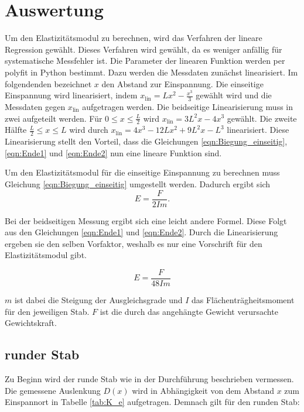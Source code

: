 


\section{Auswertung}
Um den Elastizitätsmodul zu berechnen, wird das Verfahren der lineare Regression gewählt. Dieses Verfahren wird gewählt, 
da es weniger anfällig für systematische Messfehler ist. Die Parameter der linearen Funktion werden per polyfit in Python 
bestimmt. Dazu werden die Messdaten 
zunächst linearisiert. Im folgendenden bezeichnet $x$ den Abstand zur Einspannung.
Die einseitige Einspannung wird linearisiert, indem $x_\text{lin} = L x^2 - \frac{x^3}{3}$ 
gewählt wird und die Messdaten gegen $x_\text{lin}$ aufgetragen werden.
Die beidseitige Linearisierung muss in zwei aufgeteilt werden. Für $0 \leq x \leq \frac{L}{2} $ wird 
$x_\text{lin} = 3L^2 x - 4x^3 $ gewählt. Die zweite Hälfte $\frac{L}{2} \leq x \leq L$ wird durch 
$x_\text{lin} = 4x^3 - 12 L x^2 + 9L^2 x -L^3 $ linearisiert.
Diese Linearisierung stellt den Vorteil, dass die Gleichungen \eqref{eqn:Biegung_einseitig}, \eqref{eqn:Ende1} und 
\eqref{eqn:Ende2} nun eine lineare Funktion sind. 

\noindent Um den Elastizitätsmodul für die einseitige Einspannung zu berechnen muss Gleichung \eqref{eqn:Biegung_einseitig} 
umgestellt werden. Dadurch ergibt sich 
\begin{equation}
    E=\frac{F}{2Im}.
    \label{eqn:E_e}
\end{equation}

\noindent Bei der beidseitigen Messung ergibt sich eine leicht andere Formel. Diese Folgt aus den Gleichungen \eqref{eqn:Ende1} 
und \eqref{eqn:Ende2}. Durch die Linearisierung ergeben sie den selben Vorfaktor, weshalb es nur eine Vorschrift für 
den Elastizitätsmodul gibt.

\begin{equation}
    E = \frac{F}{48 I m}
    \label{eqn:E_b}
\end{equation}

\noindent $m$ ist dabei die Steigung der Ausgleichsgrade und $I$ das Flächenträgheitsmoment für den jeweiligen Stab. 
$F$ ist die durch das angehängte Gewicht verursachte Gewichtskraft.

\label{sec:Auswertung}

\subsection{runder Stab}
\label{sec:rund}
Zu Beginn wird der runde Stab wie in der Durchführung beschrieben vermessen. Die gemessene Auslenkung $D(x)$ wird in 
Abhängigkeit von dem Abstand $x$ zum Einspannort in Tabelle \ref{tab:K_e} aufgetragen.
Demnach gilt für den runden Stab:

